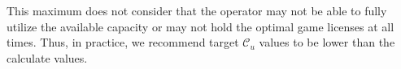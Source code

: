 

This maximum does not consider that the operator may not be able to fully utilize the available capacity or may not hold the optimal game licenses at all times. Thus, in practice, we recommend target $\mathcal{C}_{u}$ values to be lower than the calculate values.




